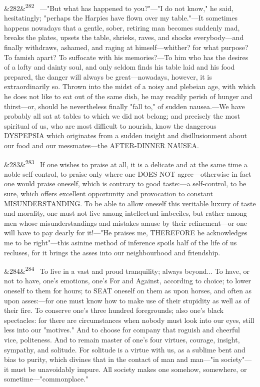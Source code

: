 \documentclass[12pt]{article}
\newcommand{\para}[1][]{\par\noindent\ifx&#1&\else\textsuperscript{\footnotesize #1}~\fi}
\begin{document}
\para[282] ---"But what has happened to you?"---"I do not know," he said, hesitatingly; "perhaps the Harpies have flown over my table."---It sometimes happens nowadays that a gentle, sober, retiring man becomes suddenly mad, breaks the plates, upsets the table, shrieks, raves, and shocks everybody---and finally withdraws, ashamed, and raging at himself---whither? for what purpose? To famish apart? To suffocate with his memories?---To him who has the desires of a lofty and dainty soul, and only seldom finds his table laid and his food prepared, the danger will always be great---nowadays, however, it is extraordinarily so. Thrown into the midst of a noisy and plebeian age, with which he does not like to eat out of the same dish, he may readily perish of hunger and thirst---or, should he nevertheless finally "fall to," of sudden nausea.---We have probably all sat at tables to which we did not belong; and precisely the most spiritual of us, who are most difficult to nourish, know the dangerous DYSPEPSIA which originates from a sudden insight and disillusionment about our food and our messmates---the AFTER-DINNER NAUSEA.

\para[283] If one wishes to praise at all, it is a delicate and at the same time a noble self-control, to praise only where one DOES NOT agree---otherwise in fact one would praise oneself, which is contrary to good taste:---a self-control, to be sure, which offers excellent opportunity and provocation to constant MISUNDERSTANDING. To be able to allow oneself this veritable luxury of taste and morality, one must not live among intellectual imbeciles, but rather among men whose misunderstandings and mistakes amuse by their refinement---or one will have to pay dearly for it!---"He praises me, THEREFORE he acknowledges me to be right"---this asinine method of inference spoils half of the life of us recluses, for it brings the asses into our neighbourhood and friendship.

\para[284] To live in a vast and proud tranquility; always beyond... To have, or not to have, one's emotions, one's For and Against, according to choice; to lower oneself to them for hours; to SEAT oneself on them as upon horses, and often as upon asses:---for one must know how to make use of their stupidity as well as of their fire. To conserve one's three hundred foregrounds; also one's black spectacles: for there are circumstances when nobody must look into our eyes, still less into our "motives." And to choose for company that roguish and cheerful vice, politeness. And to remain master of one's four virtues, courage, insight, sympathy, and solitude. For solitude is a virtue with us, as a sublime bent and bias to purity, which divines that in the contact of man and man---"in society"---it must be unavoidably impure. All society makes one somehow, somewhere, or sometime---"commonplace."
\end{document}
